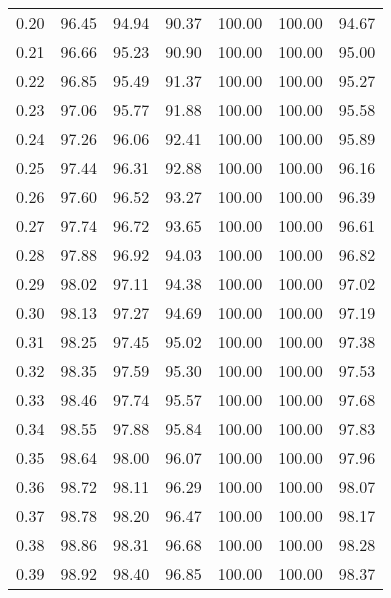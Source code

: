\begin{tabular}{|c|c|c|c|c|c|c|}
      0.20 &     96.45 &     94.94 &      90.37 &  100.00 &     100.00 &         94.67 \\
      0.21 &     96.66 &     95.23 &      90.90 &  100.00 &     100.00 &         95.00 \\
      0.22 &     96.85 &     95.49 &      91.37 &  100.00 &     100.00 &         95.27 \\
      0.23 &     97.06 &     95.77 &      91.88 &  100.00 &     100.00 &         95.58 \\
      0.24 &     97.26 &     96.06 &      92.41 &  100.00 &     100.00 &         95.89 \\
      0.25 &     97.44 &     96.31 &      92.88 &  100.00 &     100.00 &         96.16 \\
      0.26 &     97.60 &     96.52 &      93.27 &  100.00 &     100.00 &         96.39 \\
      0.27 &     97.74 &     96.72 &      93.65 &  100.00 &     100.00 &         96.61 \\
      0.28 &     97.88 &     96.92 &      94.03 &  100.00 &     100.00 &         96.82 \\
      0.29 &     98.02 &     97.11 &      94.38 &  100.00 &     100.00 &         97.02 \\
      0.30 &     98.13 &     97.27 &      94.69 &  100.00 &     100.00 &         97.19 \\
      0.31 &     98.25 &     97.45 &      95.02 &  100.00 &     100.00 &         97.38 \\
      0.32 &     98.35 &     97.59 &      95.30 &  100.00 &     100.00 &         97.53 \\
      0.33 &     98.46 &     97.74 &      95.57 &  100.00 &     100.00 &         97.68 \\
      0.34 &     98.55 &     97.88 &      95.84 &  100.00 &     100.00 &         97.83 \\
      0.35 &     98.64 &     98.00 &      96.07 &  100.00 &     100.00 &         97.96 \\
      0.36 &     98.72 &     98.11 &      96.29 &  100.00 &     100.00 &         98.07 \\
      0.37 &     98.78 &     98.20 &      96.47 &  100.00 &     100.00 &         98.17 \\
      0.38 &     98.86 &     98.31 &      96.68 &  100.00 &     100.00 &         98.28 \\
      0.39 &     98.92 &     98.40 &      96.85 &  100.00 &     100.00 &         98.37 \\

\end{tabular}
